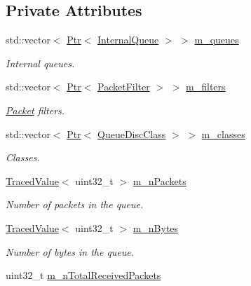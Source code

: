 \subsection*{Private Attributes}
\begin{DoxyCompactItemize}
\item 
std\+::vector$<$ \hyperlink{classns3_1_1Ptr}{Ptr}$<$ \hyperlink{classns3_1_1QueueDisc_a3acb7d460465f9f13c6fbbdeae7508f8}{Internal\+Queue} $>$ $>$ \hyperlink{classns3_1_1QueueDisc_ae6507c7002e15afd8944a34f239331d7}{m\+\_\+queues}
\begin{DoxyCompactList}\small\item\em Internal queues. \end{DoxyCompactList}\item 
std\+::vector$<$ \hyperlink{classns3_1_1Ptr}{Ptr}$<$ \hyperlink{classns3_1_1PacketFilter}{Packet\+Filter} $>$ $>$ \hyperlink{classns3_1_1QueueDisc_a04bc2a1d90315527c6ba411eb2cb722a}{m\+\_\+filters}
\begin{DoxyCompactList}\small\item\em \hyperlink{classns3_1_1Packet}{Packet} filters. \end{DoxyCompactList}\item 
std\+::vector$<$ \hyperlink{classns3_1_1Ptr}{Ptr}$<$ \hyperlink{classns3_1_1QueueDiscClass}{Queue\+Disc\+Class} $>$ $>$ \hyperlink{classns3_1_1QueueDisc_a054d624a7a6f10a11cffec1f858feb3c}{m\+\_\+classes}
\begin{DoxyCompactList}\small\item\em Classes. \end{DoxyCompactList}\item 
\hyperlink{classns3_1_1TracedValue}{Traced\+Value}$<$ uint32\+\_\+t $>$ \hyperlink{classns3_1_1QueueDisc_a7afc9edf0fdb517d088ebe8d3747fbef}{m\+\_\+n\+Packets}
\begin{DoxyCompactList}\small\item\em Number of packets in the queue. \end{DoxyCompactList}\item 
\hyperlink{classns3_1_1TracedValue}{Traced\+Value}$<$ uint32\+\_\+t $>$ \hyperlink{classns3_1_1QueueDisc_a5c9e0e5c858f333bb15089eea58a1e3b}{m\+\_\+n\+Bytes}
\begin{DoxyCompactList}\small\item\em Number of bytes in the queue. \end{DoxyCompactList}\item 
uint32\+\_\+t \hyperlink{classns3_1_1QueueDisc_afc5d0c189f8d08582a84fce36fea8745}{m\+\_\+n\+Total\+Received\+Packets}

\end{DoxyCompactItemize}

